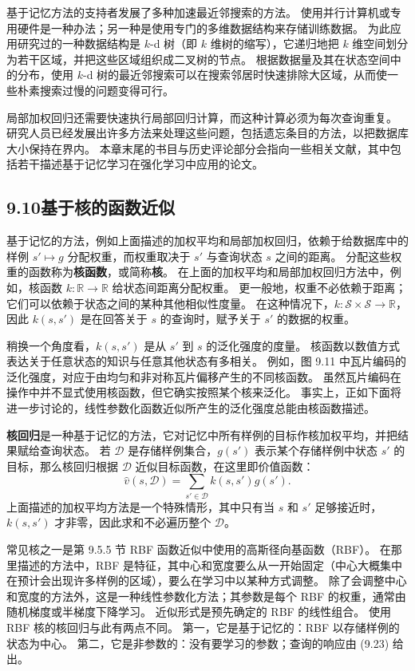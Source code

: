 \documentclass[UTF8, 12pt, fontset=fandol, oneside]{ctexart}
\begin{document}
基于记忆方法的支持者发展了多种加速最近邻搜索的方法。
使用并行计算机或专用硬件是一种办法；另一种是使用专门的多维数据结构来存储训练数据。
为此应用研究过的一种数据结构是 $k$-d 树（即 $k$ 维树的缩写），它递归地把 $k$ 维空间划分为若干区域，并把这些区域组织成二叉树的节点。
根据数据量及其在状态空间中的分布，使用 $k$-d 树的最近邻搜索可以在搜索邻居时快速排除大区域，从而使一些朴素搜索过慢的问题变得可行。

局部加权回归还需要快速执行局部回归计算，而这种计算必须为每次查询重复。
研究人员已经发展出许多方法来处理这些问题，包括遗忘条目的方法，以把数据库大小保持在界内。
本章末尾的书目与历史评论部分会指向一些相关文献，其中包括若干描述基于记忆学习在强化学习中应用的论文。

\subsection*{9.10\quad 基于核的函数近似}

基于记忆的方法，例如上面描述的加权平均和局部加权回归，依赖于给数据库中的样例 $s'\mapsto g$ 分配权重，而权重取决于 $s'$ 与查询状态 $s$ 之间的距离。
分配这些权重的函数称为\textbf{核函数}，或简称\textbf{核}。
在上面的加权平均和局部加权回归方法中，例如，核函数 $k:\mathbb{R}\to\mathbb{R}$ 给状态间距离分配权重。
更一般地，权重不必依赖于距离；它们可以依赖于状态之间的某种其他相似性度量。
在这种情况下，$k:\mathcal{S}\times\mathcal{S}\to\mathbb{R}$，因此 $k(s,s')$ 是在回答关于 $s$ 的查询时，赋予关于 $s'$ 的数据的权重。

稍换一个角度看，$k(s,s')$ 是从 $s'$ 到 $s$ 的泛化强度的度量。
核函数以数值方式表达关于任意状态的知识与任意其他状态有多相关。
例如，图 9.11 中瓦片编码的泛化强度，对应于由均匀和非对称瓦片偏移产生的不同核函数。
虽然瓦片编码在操作中并不显式使用核函数，但它确实按照某个核来泛化。
事实上，正如下面将进一步讨论的，线性参数化函数近似所产生的泛化强度总能由核函数描述。

\textbf{核回归}是一种基于记忆的方法，它对记忆中所有样例的目标作核加权平均，并把结果赋给查询状态。
若 $\mathcal{D}$ 是存储样例集合，$g(s')$ 表示某个存储样例中状态 $s'$ 的目标，那么核回归根据 $\mathcal{D}$ 近似目标函数，在这里即价值函数：
\begin{equation}
\hat{v}(s,\mathcal{D})=\sum_{s'\in\mathcal{D}}k(s,s')g(s').
\tag{9.23}
\end{equation}
上面描述的加权平均方法是一个特殊情形，其中只有当 $s$ 和 $s'$ 足够接近时，$k(s,s')$ 才非零，因此求和不必遍历整个 $\mathcal{D}$。

常见核之一是第 9.5.5 节 RBF 函数近似中使用的高斯径向基函数（RBF）。
在那里描述的方法中，RBF 是特征，其中心和宽度要么从一开始固定（中心大概集中在预计会出现许多样例的区域），要么在学习中以某种方式调整。
除了会调整中心和宽度的方法外，这是一种线性参数化方法；其参数是每个 RBF 的权重，通常由随机梯度或半梯度下降学习。
近似形式是预先确定的 RBF 的线性组合。
使用 RBF 核的核回归与此有两点不同。
第一，它是基于记忆的：RBF 以存储样例的状态为中心。
第二，它是非参数的：没有要学习的参数；查询的响应由 (9.23) 给出。
\end{document}
